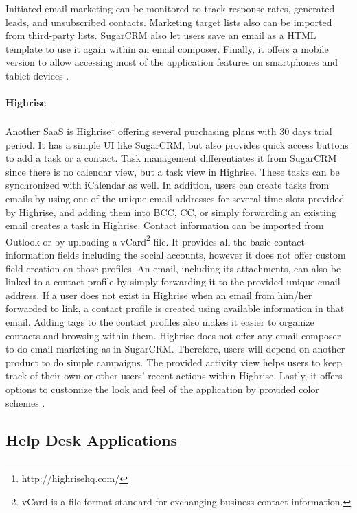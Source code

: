 Initiated email marketing can be monitored to track response rates, generated leads, and unsubscribed contacts. Marketing target lists also can be imported from third-party lists. SugarCRM also let users save an email as a \ac{HTML} template to use it again within an email composer. Finally, it offers a mobile version to allow accessing most of the application features on smartphones and tablet devices \citep{SugarCRMInc.2013}.

\paragraph{Highrise}
Another \ac{SaaS} is Highrise\footnote{http://highrisehq.com/} offering several purchasing plans with 30 days trial period. It has a simple \ac{UI} like SugarCRM, but also provides quick access buttons to add a task or a contact. Task management differentiates it from SugarCRM since there is no calendar view, but a task view in Highrise. These tasks can be synchronized with iCalendar as well. In addition, users can create tasks from emails by using one of the unique email addresses for several time slots provided by Highrise, and adding them into \ac{BCC}, \ac{CC}, or simply forwarding an existing email creates a task in Highrise. Contact information can be imported from Outlook or by uploading a vCard\footnote{vCard is a file format standard for exchanging business contact information.} file. It provides all the basic contact information fields including the social accounts, however it does not offer custom field creation on those profiles. An email, including its attachments, can also be linked to a contact profile by simply forwarding it to the provided unique email address. If a user does not exist in Highrise when an email from him/her forwarded to link, a contact profile is created using available information in that email. Adding tags to the contact profiles also makes it easier to organize contacts and browsing within them. Highrise does not offer any email composer to do email marketing as in SugarCRM. Therefore, users will depend on another product to do simple campaigns. The provided activity view helps users to keep track of their own or other users' recent actions within Highrise. Lastly, it offers options to customize the look and feel of the application by provided color schemes \citep{37signals2013}.

\subsection{Help Desk Applications}
\label{subsec:3.3.2:HelpDeskAppl}

